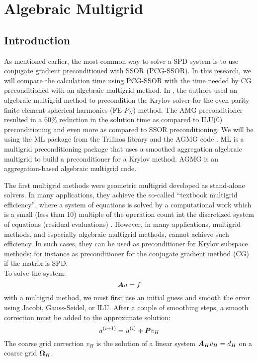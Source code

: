 \section{Algebraic Multigrid} \label{sec_amg}
\subsection{Introduction}
As mentioned earlier, the most common way to solve a SPD system is to use
conjugate gradient preconditioned with SSOR (PCG-SSOR). In this research, we
will compare the calculation time using PCG-SSOR with the time needed by CG 
preconditioned with an algebraic multigrid method. In \cite{amg_pn}, the authors 
used an algebraic multigrid method to precondition the Krylov solver for the 
even-parity finite element-spherical harmonics (FE-$P_N$) method. The AMG 
preconditioner resulted in a 60\% reduction in the solution time as compared to 
ILU(0) preconditioning and even more as compared to SSOR preconditioning. We will 
be using the ML package \cite{ml_guide} from the Trilinos library and the AGMG
code \cite{agmg_guide}. ML is a multigrid preconditioning package that
uses a smoothed aggregation algebraic multigrid to build a preconditioner for
a Krylov method. AGMG is an aggregation-based algebraic multigrid code.

The first multigrid methods were geometric multigrid developed as stand-alone
solvers. In many applications, they achieve the so-called ``textbook multigrid
efficiency'', where a system of equations is solved by a
computational work which is a small (less than 10) multiple of the operation
count int the discretized system of equations (residual evaluations)
\cite{k_cycle}. However, in many applications, multigrid methods, and
especially algebraic multigrid methods, cannot achieve such efficiency. In
such cases, they can be used as preconditioner for Krylov subspace methods;
for instance as preconditioner for the conjugate gradient method (CG) if the
matrix is SPD.\\ 

To solve the system:
\begin{equation}
\boldsymbol{A}u=f
\end{equation}
with a multigrid method, we must first use an initial guess and smooth the error 
using Jacobi, Gauss-Seidel, or ILU. After a couple of smoothing steps, a smooth 
correction must be added to the approximate solution:
\begin{equation}
u^{(i+1)} = u^{(i)}+\boldsymbol{P}v_{H}
\end{equation}
The coarse grid correction $v_H$ is the solution of a linear system $\boldsymbol{A}_H
v_H = d_H$ on a coarse grid $\boldsymbol{\Omega}_H$.

